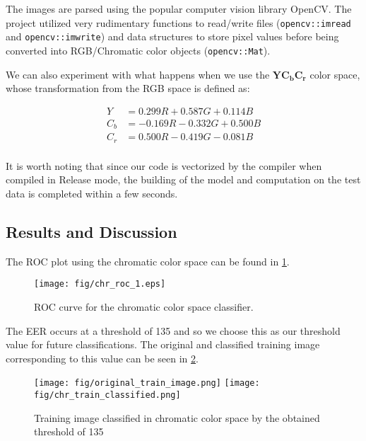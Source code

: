 \documentclass[headings=optiontoheadandtoc,listof=totoc,parskip=full]{scrartcl}
\begin{document}
The images are parsed using the popular computer vision library OpenCV. The project utilized very rudimentary functions to read/write files (\texttt{opencv::imread} and \texttt{opencv::imwrite}) and data structures to store pixel values before being converted into RGB/Chromatic color objects (\texttt{opencv::Mat}).

We can also experiment with what happens when we use the $\mathbf{YC_bC_r}$ color space, whose transformation from the RGB space is defined as:

\begin{equation}
\begin{aligned}
    Y &= 0.299R + 0.587G + 0.114B \\
    C_b &= -0.169R - 0.332G + 0.500B \\
    C_r &= 0.500R - 0.419G - 0.081B \\
\end{aligned}
\end{equation}

It is worth noting that since our code is vectorized by the compiler when compiled in Release mode, the building of the model and computation on the test data is completed within a few seconds. 

\newpage
\subsection{Results and Discussion}
The ROC plot using the chromatic color space can be found in \cref{fig:chr_roc_1}. 

%
\begin{figure}[H]
\centering
\texttt{[image: fig/chr\_roc\_1.eps]}
\caption{ROC curve for the chromatic color space classifier.}
\label{fig:chr_roc_1}
\end{figure}


The EER occurs at a threshold of 135 and so we choose this as our threshold value for future classifications. The original and classified training image corresponding to this value can be seen in \cref{fig:chr_train_classified_image}.

%
\begin{figure}[H]
    \centering
    \texttt{[image: fig/original\_train\_image.png]}
    \texttt{[image: fig/chr\_train\_classified.png]}
    \caption{Training image classified in chromatic color space by the obtained threshold of 135}
    \label{fig:chr_train_classified_image}
\end{figure}
\end{document}

